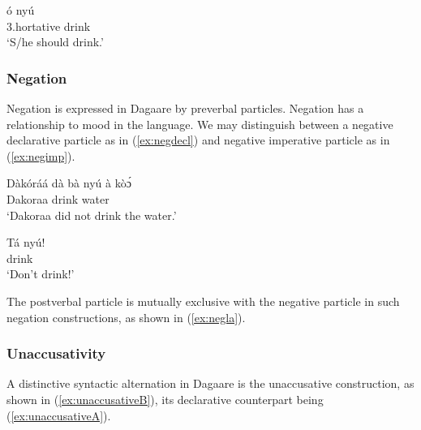 \ea \label{ex:hortsent} \gll ó nyú\\
3{\SG}.hortative drink\\
\glt ‘S/he should drink.’\z 

\subsubsection{ Negation}
Negation is expressed in Dagaare by preverbal particles. Negation has a relationship
to mood in the language. We may distinguish between a negative declarative particle as in (\ref{ex:negdecl})
and negative imperative particle as in (\ref{ex:negimp}).

\ea \label{ex:negdecl} \gll Dàkóráá dà bà nyú à kòɔ́\\
Dakoraa {\PST} {\NEG} drink {\DEF} water\\
\glt ‘Dakoraa did not drink the water.’\z

\ea \label{ex:negimp} \gll Tá nyú!\\
{\NEG} drink\\
\glt ‘Don’t drink!’\z 

The postverbal particle is mutually exclusive with the negative particle in such negation constructions, as shown in (\ref{ex:negla}).

\ea \label{ex:negla} 
\z\z

\iffalse 

\subsubsection{Unaccusativity}
A distinctive syntactic alternation in Dagaare is the unaccusative construction, as
shown in (\ref{ex:unaccusativeB}), its declarative counterpart being (\ref{ex:unaccusativeA}).

\ea {}
\z\z 

